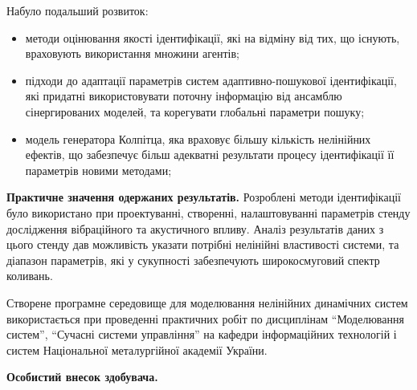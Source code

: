\documentclass[a4paper,13pt]{atuaref}
\begin{document}
\noindent
Набуло подальший розвиток:
\begin{itemize}

  \item
  методи оцінювання якості ідентифікації,
  які на відміну від тих, що існують,
  враховують використання множини агентів;

  \item
  підходи до адаптації параметрів систем
  адаптивно-пошукової ідентифікації, які придатні використовувати поточну
  інформацію від ансамблю сінергированих моделей, та корегувати глобальні
  параметри пошуку;

  \item
    модель генератора Колпітца, яка враховує
    більшу кількість нелінійних ефектів,
    що забезпечує більш адекватні результати процесу
    ідентифікації її параметрів новими методами;

\end{itemize}


\smallskip
\textbf{Практичне значення одержаних результатів.}
Розроблені методи ідентифікації було використано
при проектуванні, створенні, налаштовуванні параметрів
стенду дослідження вібраційного та акустичного впливу.
Аналіз результатів даних з цього стенду
дав можливість указати потрібні нелінійні властивості системи,
та діапазон параметрів, які у сукупності
забезпечують широкосмуговий спектр коливань.

Створене програмне середовище для моделювання нелінійних динамічних систем
використається при проведенні практичних робіт по дисциплінам
``Моделювання систем'',
``Сучасні системи управління'' на кафедри інформаційних технологій
і систем Національної металургійної академії України.


\smallskip
\textbf{Особистий внесок здобувача.}
\end{document}
